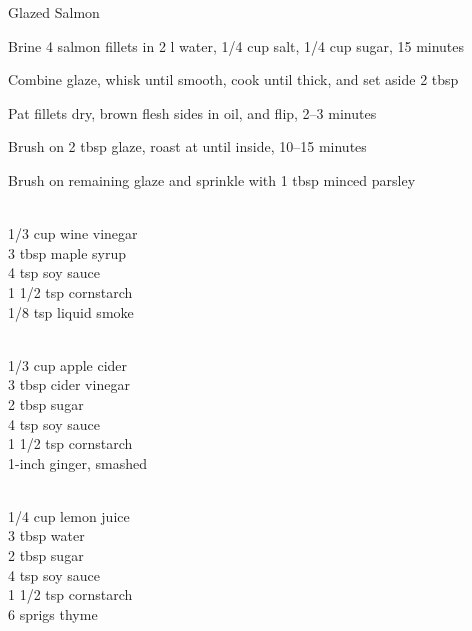 \begin{densecard}{Glazed Salmon}{}
\begin{steps}
    \item Brine 4 salmon fillets in 2 l water, 1/4 cup salt, 1/4 cup sugar, 15 minutes
    \item Combine glaze, whisk until smooth, cook until thick, and set aside 2 tbsp
    \item Pat fillets dry, brown flesh sides in oil, and flip, 2--3 minutes
    \item Brush on 2 tbsp glaze, roast at  until  inside, 10--15 minutes
    \item Brush on remaining glaze and sprinkle with 1 tbsp minced parsley
\end{steps}
\begin{paracol}{3}
\begin{ingredients}
\\
1/3 cup wine vinegar\\
3 tbsp maple syrup\\
4 tsp soy sauce\\
1 1/2 tsp cornstarch\\
1/8 tsp liquid smoke
\end{ingredients}
\nextcolumn
\begin{ingredients}
\\
1/3 cup apple cider\\
3 tbsp cider vinegar\\
2 tbsp sugar\\
4 tsp soy sauce\\
1 1/2 tsp cornstarch\\
1-inch ginger, smashed
\end{ingredients}
\nextcolumn
\begin{ingredients}
\\
1/4 cup lemon juice\\
3 tbsp water\\
2 tbsp sugar\\
4 tsp soy sauce\\
1 1/2 tsp cornstarch\\
6 sprigs thyme
\end{ingredients}
\end{paracol}
\end{densecard}

